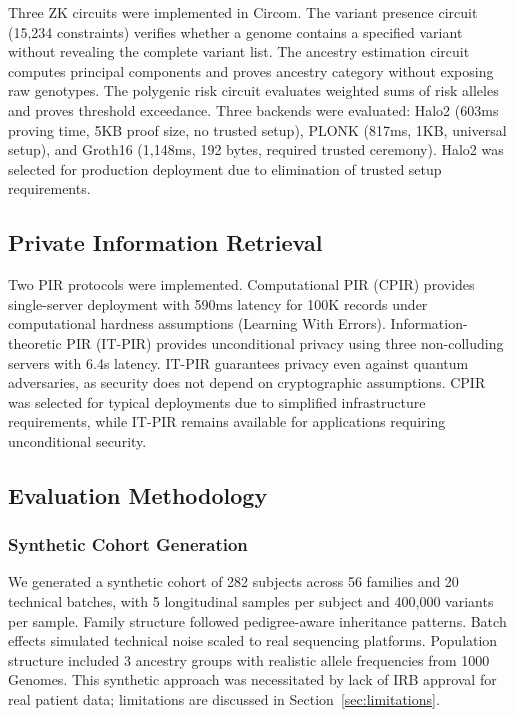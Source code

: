 \documentclass[11pt,letterpaper]{article}
\begin{document}
Three ZK circuits were implemented in Circom. The variant presence circuit (15,234 constraints) verifies whether a genome contains a specified variant without revealing the complete variant list. The ancestry estimation circuit computes principal components and proves ancestry category without exposing raw genotypes. The polygenic risk circuit evaluates weighted sums of risk alleles and proves threshold exceedance. Three backends were evaluated: Halo2 (603ms proving time, 5KB proof size, no trusted setup), PLONK (817ms, 1KB, universal setup), and Groth16 (1,148ms, 192 bytes, required trusted ceremony). Halo2 was selected for production deployment due to elimination of trusted setup requirements.

\subsection{Private Information Retrieval}

Two PIR protocols were implemented. Computational PIR (CPIR) provides single-server deployment with 590ms latency for 100K records under computational hardness assumptions (Learning With Errors). Information-theoretic PIR (IT-PIR) provides unconditional privacy using three non-colluding servers with 6.4s latency. IT-PIR guarantees privacy even against quantum adversaries, as security does not depend on cryptographic assumptions. CPIR was selected for typical deployments due to simplified infrastructure requirements, while IT-PIR remains available for applications requiring unconditional security.

\subsection{Evaluation Methodology}

\subsubsection{Synthetic Cohort Generation}

We generated a synthetic cohort of 282 subjects across 56 families and 20 technical batches, with 5 longitudinal samples per subject and 400,000 variants per sample. Family structure followed pedigree-aware inheritance patterns. Batch effects simulated technical noise scaled to real sequencing platforms. Population structure included 3 ancestry groups with realistic allele frequencies from 1000 Genomes. This synthetic approach was necessitated by lack of IRB approval for real patient data; limitations are discussed in Section~\ref{sec:limitations}.
\end{document}
